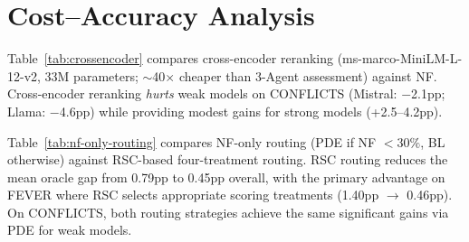 \documentclass[11pt]{article}
\theoremstyle{definition}
\begin{document}
\section{Cost--Accuracy Analysis}
\label{sec:appendix-cost-accuracy}

Table~\ref{tab:crossencoder} compares cross-encoder reranking
(ms-marco-MiniLM-L-12-v2, 33M parameters; \({\sim}\)40\(\times\) cheaper
than 3-Agent assessment) against NF.
Cross-encoder reranking \emph{hurts} weak models on CONFLICTS (Mistral: \(-\)2.1pp; Llama: \(-\)4.6pp) while providing modest gains for strong models (+2.5--4.2pp).

\begin{table}[htb]
\centering
\small
{}
\caption{Cross-encoder reranking vs.\ NF baseline (EM\%) and LLM call costs.
CE = ms-marco-MiniLM-L-12-v2 (33M params, \({\sim}\)40\(\times\) cheaper than 3-Agent). \emph{Notes:} LLM calls/query: NF = 1 gen.; 3-Agent/CoT/SDA \(\approx\) 19; ATF \(\approx\) 19 + 1 gen.; PDE \(\approx\) 19 + \(d\) gen.\ (\(d{=}10\)); PDE-Random = \(d\) gen.\ (no assessment).}
\label{tab:crossencoder}
\end{table}

Table~\ref{tab:nf-only-routing} compares NF-only routing
(PDE if NF \(< 30\%\), BL otherwise) against RSC-based four-treatment routing.
RSC routing reduces the mean oracle gap from 0.79pp to 0.45pp overall,
with the primary advantage on FEVER where RSC selects appropriate scoring treatments (1.40pp \(\to\) 0.46pp).
On CONFLICTS, both routing strategies achieve the same significant gains via PDE for weak models.
\end{document}

